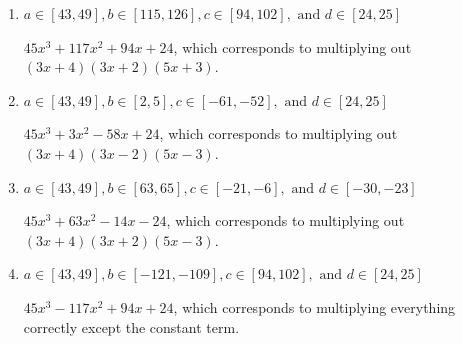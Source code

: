 \documentclass{extbook}[14pt]
\begin{document}
\begin{enumerate}
{\begin{enumerate}[label=\Alph*.]
* $45x^{3} -117 x^{2} +94 x -24$, which is the correct option.
\item \( a \in [43, 49], b \in [115, 126], c \in [94, 102], \text{ and } d \in [24, 25] \)

$45x^{3} +117 x^{2} +94 x + 24$, which corresponds to multiplying out $(3x + 4)(3x + 2)(5x + 3)$.
\item \( a \in [43, 49], b \in [2, 5], c \in [-61, -52], \text{ and } d \in [24, 25] \)

$45x^{3} +3 x^{2} -58 x + 24$, which corresponds to multiplying out $(3x + 4)(3x -2)(5x -3)$.
\item \( a \in [43, 49], b \in [63, 65], c \in [-21, -6], \text{ and } d \in [-30, -23] \)

$45x^{3} +63 x^{2} -14 x -24$, which corresponds to multiplying out $(3x + 4)(3x + 2)(5x -3)$.
\item \( a \in [43, 49], b \in [-121, -109], c \in [94, 102], \text{ and } d \in [24, 25] \)

$45x^{3} -117 x^{2} +94 x + 24$, which corresponds to multiplying everything correctly except the constant term.
\end{enumerate}

}
\end{enumerate}
\end{document}
